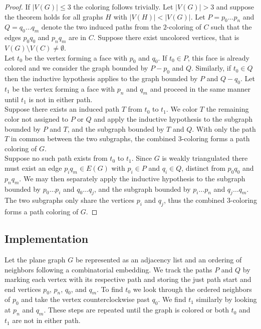 \documentclass[11pt,letter]{article}
\begin{document}
\begin{proof}
\noindent If $|V(G)|\le 3$ the coloring follows trivially. Let $|V(G)|>3$ and suppose the theorem holds
for all graphs $H$ with $|V(H)|<|V(G)|$. Let $P=p_0\ldots p_n$ and $Q=q_0\ldots q_m$ denote the two induced paths from the $2$-coloring of $C$
such that the edges $p_0q_0$ and $p_nq_m$ are in $C$. Suppose there exist uncolored vertices, that is
$V(G)\setminus V(C)\ne\emptyset$.\\

\noindent Let $t_0$ be the vertex forming a face with $p_0$ and $q_0$. If $t_0\in P$, this face is already
colored and we consider the graph bounded by $P-p_0$ and $Q$. Similarly, if $t_0\in Q$ then the inductive
hypothesis applies to the graph bounded by $P$ and $Q-q_0$. Let $t_1$ be the vertex forming a face with $p_n$
and $q_m$ and proceed in the same manner until $t_1$ is not in either path.\\

\noindent Suppose there exists an induced path $T$ from $t_0$ to $t_1$. We color $T$ the remaining color not
assigned to $P$ or $Q$ and apply the inductive hypothesis to the subgraph bounded by $P$ and $T$, and the
subgraph bounded by $T$ and $Q$. With only the path $T$ in common between the two subgraphs, the combined
$3$-coloring forms a path coloring of $G$.\\

\noindent Suppose no such path exists from $t_0$ to $t_1$. Since $G$ is weakly triangulated there must exist an
edge $p_iq_m\in E(G)$ with $p_i\in P$ and $q_i\in Q$, distinct from $p_0q_0$ and $p_nq_m$. We may then separately
apply the inductive hypothesis to the subgraph bounded by
$p_0\ldots p_i$ and $q_0\ldots q_j$, and the subgraph bounded by $p_i\ldots p_n$ and $q_j\ldots q_m$. The two
subgraphs only share the vertices $p_i$ and $q_j$, thus the combined $3$-coloring forms a path coloring
of $G$.
\end{proof}

\subsection*{Implementation}

Let the plane graph $G$ be represented as an adjacency list and an ordering of neighbors following a
combinatorial embedding. We track the paths $P$ and $Q$ by marking each vertex with its respective path and
storing the just path start and end vertices $p_0$, $p_n$, $q_0$, and $q_m$.
To find $t_0$ we look through the ordered neighbors of $p_0$ and take the vertex counterclockwise past
$q_0$. We find $t_1$ similarly by looking at $p_n$ and $q_m$. These steps are repeated until the graph is colored
or both $t_0$ and $t_1$ are not in either path.
\end{document}
